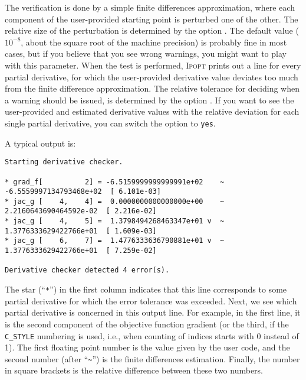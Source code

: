 \documentclass[10pt]{article}
\newcommand{\Ipopt}{\textsc{Ipopt}\xspace}
\begin{document}
The verification is done by a simple finite differences approximation,
where each component of the user-provided starting point is perturbed
one of the other.  The relative size of the perturbation is determined
by the option .  The default value
($10^{-8}$, about the square root of the machine precision) is
probably fine in most cases, but if you believe that you see wrong
warnings, you might want to play with this parameter.  When the test is
performed, \Ipopt prints out a line for every partial derivative, for
which the user-provided derivative value deviates too much from the
finite difference approximation.  The relative tolerance for deciding
when a warning should be issued, is determined by the option
.
If you want to see the user-provided and
estimated derivative values with the relative deviation for each
single partial derivative, you can switch the
option to {\tt yes}.

A typical output is:

\begin{footnotesize}
\begin{verbatim}
Starting derivative checker.

* grad_f[          2] = -6.5159999999999991e+02    ~ -6.5559997134793468e+02  [ 6.101e-03]
* jac_g [    4,    4] =  0.0000000000000000e+00    ~  2.2160643690464592e-02  [ 2.216e-02]
* jac_g [    4,    5] =  1.3798494268463347e+01 v  ~  1.3776333629422766e+01  [ 1.609e-03]
* jac_g [    6,    7] =  1.4776333636790881e+01 v  ~  1.3776333629422766e+01  [ 7.259e-02]

Derivative checker detected 4 error(s).
\end{verbatim}
\end{footnotesize}

The star (``\verb|*|'') in the first column indicates that this line
corresponds to some partial derivative for which the error tolerance
was exceeded.  Next, we see which partial derivative is concerned in
this output line.  For example, in the first line, it is the second
component of the objective function gradient (or the third, if the
{\tt C\_STYLE} numbering is used, i.e., when counting of indices
starts with 0 instead of 1).  The first floating point number is the
value given by the user code, and the second number (after
``\verb|~|'') is the finite differences estimation.  Finally, the
number in square brackets is the relative difference between these two
numbers.
\end{document}
